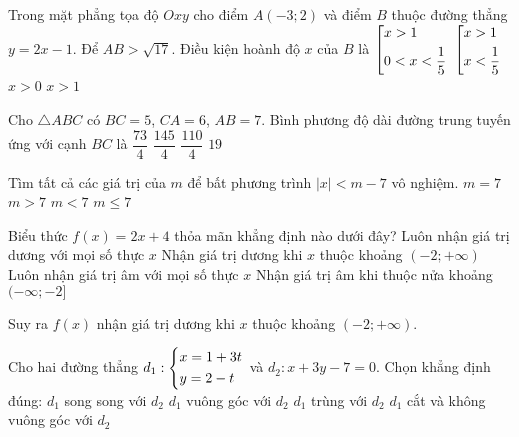 \begin{ex}%
Trong mặt phẳng tọa độ $Oxy$ cho điểm $A(-3; 2)$ và điểm $B$ thuộc đường thẳng $y=2x-1$. Để $AB>\sqrt{17}$. Điều kiện hoành độ $x$ của $B$ là
\choice
{$\left[\begin{aligned}&x>1\\&0<x<\dfrac{1}{5}\end{aligned}\right.$}
{\True $\left[\begin{aligned}&x>1\\&x<\dfrac{1}{5}\end{aligned}\right.$}
{$x>0$}
{$x>1$}
\end{ex}
\begin{ex}%
Cho $\triangle ABC$ có $BC=5$, $CA=6$, $AB=7$. Bình phương độ dài đường trung tuyến ứng với cạnh $BC$ là
\choice
{$\dfrac{73}{4}$}
{\True $\dfrac{145}{4}$}
{$\dfrac{110}{4}$}
{$19$}
\end{ex}

\begin{ex}%
Tìm tất cả các giá trị của $m$ để bất phương trình $\vert x \vert < m-7$ vô nghiệm.
\choice
{$m=7$}
{$m>7$}
{\True $m<7$}
{$m\leq 7$}
\end{ex}

\begin{ex}%
Biểu thức $f(x)=2x+4$ thỏa mãn khẳng định nào dưới đây?
\choice
{Luôn nhận giá trị dương với mọi số thực $x$}
{\True Nhận giá trị dương khi $x$ thuộc khoảng $(-2; +\infty)$}
{Luôn nhận giá trị âm với mọi số thực $x$}
{Nhận giá trị âm khi thuộc nửa khoảng $(-\infty; -2]$}
\end{ex}
Suy ra $f(x)$ nhận giá trị dương khi $x$ thuộc khoảng $(-2; +\infty)$.
\begin{ex}%
Cho hai đường thẳng $d_1: \left\{\begin{aligned}& x=1+3t\\&y=2-t\end{aligned}\right.$ và $d_2: x+3y-7=0$. Chọn khẳng định đúng:
\choice
{ $d_1$ song song với $d_2$}
{ $d_1$ vuông góc với $d_2$}
{\True $d_1$ trùng với $d_2$}
{$d_1$ cắt và không vuông góc với $d_2$}
\end{ex}

